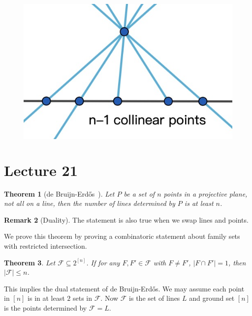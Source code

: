 \documentclass{article}
\newtheorem{theorem}{Theorem}[section]
\theoremstyle{definition}
\newtheorem{remark}[theorem]{Remark}
\def\Erdos{Erd\H{o}s}
\begin{document}
     \begin{figure}[H]
        \centering
        \includegraphics[scale=0.3]{20-3.jpg}
    \end{figure}

\newpage
\section{Lecture 21}

\begin{theorem}[de Bruijn-\Erdos{}~\cite{bruijn1951colour}]
    Let $P$ be a set of $n$ points in a projective plane, not all on a line, then the number of lines determined by $P$ is at least $n$.
\end{theorem}

\begin{remark}[Duality]
    The statement is also true when we swap lines and points.
\end{remark}

We prove this theorem by proving a combinatoric statement about family sets with restricted intersection.

\begin{theorem}\label{de bruijn-erdos}
    Let $\mathcal{F}\subseteq 2^{[n]}$. If for any $F,F' \in \mathcal{F}$ with $F\neq F'$, $|F\cap F'|=1$, then $|\mathcal{F}|\leq n$.
\end{theorem}

This implies the dual statement of de Bruijn-\Erdos{}. We may assume each point in $[n]$ is in at least $2$ sets in $\mathcal{F}$. Now $\mathcal{F}$ is the set of lines $L$ and ground set $[n]$ is the points determined by $\mathcal{F}=L$.
\end{document}
